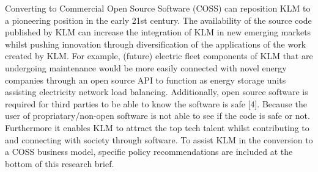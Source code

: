 \documentclass[portrait,a0paper]{rudi-poster}  %
\begin{document}
\begin{rudiblockmethods}
    Converting to Commercial Open Source Software (COSS) can reposition KLM to a pioneering position in the early 21st century. The availability of the source code published by KLM can increase the integration of KLM in new emerging markets whilst pushing innovation through diversification of the applications of the work created by KLM. For example, (future) electric fleet components of KLM that are undergoing maintenance would be more easily connected with novel energy companies through an open source API to function as energy storage units assisting electricity network load balancing. 
    Additionally, open source software is required for third parties to be able to know the software is safe [4]. Because the user of propriatary/non-open software is not able to see if the code is safe or not. Furthermore it enables KLM to attract the top tech talent whilst contributing to and connecting with society through software. To assist KLM in the conversion to a COSS business model, specific policy recommendations are included at the bottom of this research brief.
        
        
        
        
\end{rudiblockmethods}

\end{document}
